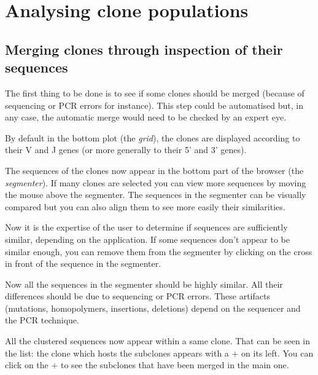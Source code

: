 \documentclass[11pt]{article}
\begin{document}
\section{Analysing clone populations}

\subsection{Merging clones through inspection of their sequences}

The first thing to be done is to see if some clones should be merged (because
of sequencing or PCR errors for instance). This step could be automatised
but, in any case, the automatic merge would need to be checked by an expert
eye.

By default in the bottom plot (the \textit{grid}), the clones
  are displayed according to their V and J genes (or more generally to their
  5' and 3' genes). 


The sequences of the clones now appear in the bottom part of the browser (the
\textit{segmenter}). If many clones are selected you can view more sequences
by moving the mouse above the segmenter.
The sequences in the segmenter can be visually compared but you can also align
them to see more easily their similarities.

Now it is the expertise of the user to determine if sequences are sufficiently
similar, depending on the application. If some sequences don't appear to be similar enough, you can remove
them from the segmenter by clicking on the cross in front of the sequence in
the segmenter.

Now all the sequences in the segmenter should be highly similar. All their
differences should be due to sequencing or PCR errors.
These artifacts (mutations, homopolymers, insertions, deletions)
depend on the sequencer and the PCR technique.


All the clustered sequences now appear within a same clone. That can be seen
in the list: the clone which hosts the subclones appears with a $+$ on its
left. You can click on the $+$ to see the subclones that have been merged in
the main one.
\end{document}
